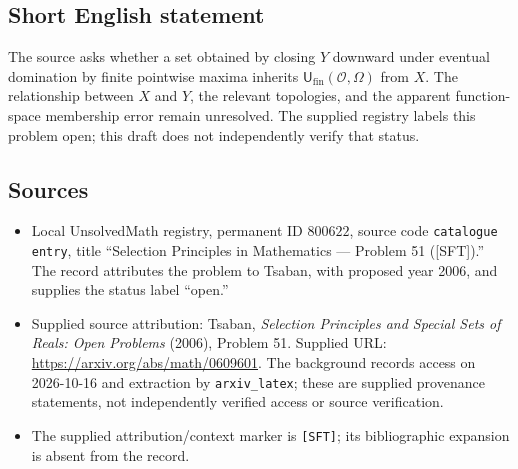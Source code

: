 \documentclass[11pt]{article}
\begin{document}
\subsection{Short English statement}
The source asks whether a set obtained by closing \(Y\) downward under eventual domination by finite pointwise maxima inherits \(\mathsf U_{\mathrm{fin}}(\mathcal O,\Omega)\) from \(X\). The relationship between \(X\) and \(Y\), the relevant topologies, and the apparent function-space membership error remain unresolved. The supplied registry labels this problem open; this draft does not independently verify that status.
\subsection{Sources}
\begin{itemize}
\item Local UnsolvedMath registry, permanent ID \(800622\), source code \texttt{catalogue entry}, title ``Selection Principles in Mathematics --- Problem 51 ([SFT]).'' The record attributes the problem to Tsaban, with proposed year 2006, and supplies the status label ``open.''
\item Supplied source attribution: Tsaban, \emph{Selection Principles and Special Sets of Reals: Open Problems} (2006), Problem 51. Supplied URL: \url{https://arxiv.org/abs/math/0609601}. The background records access on 2026-10-16 and extraction by \texttt{arxiv\_latex}; these are supplied provenance statements, not independently verified access or source verification.
\item The supplied attribution/context marker is \texttt{[SFT]}; its bibliographic expansion is absent from the record.
\end{itemize}
\end{document}
